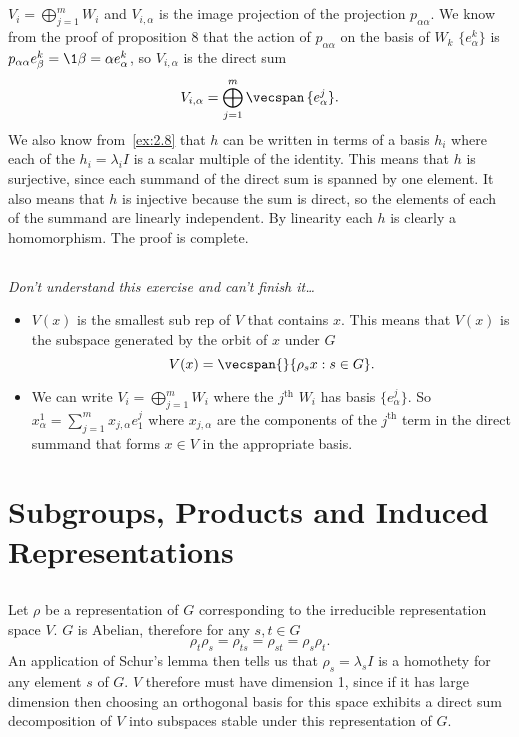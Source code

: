\documentclass[a4paper, oneside, 10pt]{article}
\numberwithin{Answer}{section}
\numberwithin{Exercise}{section}
\begin{document}
\subsection{}
$V_i = \bigoplus_{j=1}^m W_i$ and $V_{i, \alpha}$ is the image projection of the projection $p_{\alpha \alpha}$.
We know from the proof of proposition 8 that the action of $p_{\alpha \alpha}$ on the basis of $W_k$ $\{e^k_\alpha\}$
is $p_{\alpha \alpha}e^k_\beta = \1{\beta = \alpha} e^k_\alpha$, so $V_{i, \alpha}$ is the direct sum
\[
    V_{i, \alpha} = \bigoplus_{j=1}^m \vecspan \,\{e^j_\alpha\}.
\]
We also know from~\ref{ex:2.8} that $h$ can be written in terms of a basis $h_i$ where
each of the $h_i = \lambda_i I$ is a scalar multiple of the identity.
This means that $h$ is surjective, since each summand of the direct sum is spanned by one element.
It also means that $h$ is injective because the sum is direct, so the elements of 
each of the summand are linearly independent.
By linearity each $h$ is clearly a homomorphism.
The proof is complete.

\subsection{}
\emph{Don't understand this exercise and can't finish it\dots}
\begin{itemize}
    \item $V(x)$ is the smallest sub rep of $V$ that contains $x$. This means that $V(x)$ is the subspace
        generated by the orbit of $x$ under $G$
        \[
            V(x) = \vecspan{} \{\rho_s x: s \in G\}.
        \]
    \item We can write $V_i = \bigoplus_{j=1}^m W_i$ where the $j^{\text{th}}$ $W_i$ has basis $\{e^j_\alpha\}$.
        So $x^1_\alpha = \sum_{j=1}^m x_{j, \alpha} e^j_1$ where $x_{j, \alpha}$ are the components of 
        the $j^{\text{th}}$ term in the direct summand that forms $x \in V$ in the appropriate basis.

\end{itemize}


\section{Subgroups, Products and Induced Representations}
\subsection{}
Let $\rho$ be a representation of $G$ corresponding to the irreducible representation space $V$.
$G$ is Abelian, therefore for any $s, t \in G$
\[
    \rho_t \rho_s = \rho_{ts} = \rho_{st} = \rho_{s} \rho_{t}.
\]
An application of Schur's lemma then tells us that $\rho_s = \lambda_s I$ is a homothety for 
any element $s$ of $G$. 
$V$ therefore must have dimension 1, since if it has large dimension then choosing an orthogonal basis
for this space exhibits a direct sum decomposition of $V$ into subspaces stable under this representation of $G$. 
\end{document}
